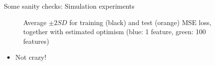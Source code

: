 \begin{frame}{Some sanity checks: Simulation experiments}
\begin{figure}[h]
	\caption{Average $\pm 2 SD$ for training (black) and test (orange) MSE loss, together with estimated optimism (blue: 1 feature, green: 100 features)}
	\end{figure}
	\begin{itemize}
		\item<2-> Not crazy!
	\end{itemize}
\end{frame}
